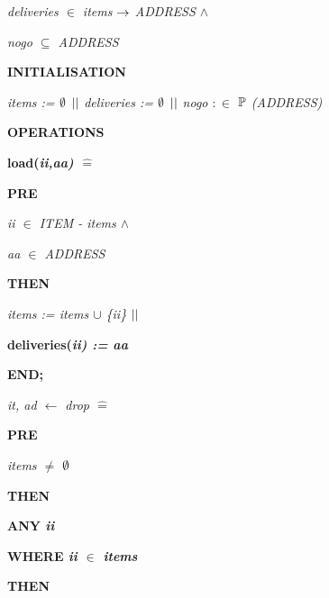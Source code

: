 \documentclass[11pt]{article}
\begin{document}
\begin{sloppypar}
\hspace*{0.20in}\it deliveries  $\in$  \it items  $\rightarrow$  \it ADDRESS  $\land$ 

\hspace*{0.20in}\it nogo  $\subseteq$  \it ADDRESS

\bf INITIALISATION

\hspace*{0.20in}\it items \rm :=  $\emptyset$   $\mbox{$\mid\mid$}$  \it deliveries \rm :=  $\emptyset$   $\mbox{$\mid\mid$}$  \it nogo  $:\in$   $\mbox{${\mathbb P}$}$ \rm (\it ADDRESS\rm )

\bf OPERATIONS

\hspace*{0.20in}\bf load\rm (\it ii\rm ,\it aa\rm ) \rm $\widehat{=}$ 

\hspace*{0.20in}\bf PRE

\hspace*{0.40in}\it ii  $\in$  \it ITEM \rm - \it items  $\land$ 

\hspace*{0.40in}\it aa  $\in$  \it ADDRESS

\hspace*{0.20in}\bf THEN

\hspace*{0.40in}\it items \rm := \it items  $\cup$  \rm \{\it ii\rm \}  $\mbox{$\mid\mid$}$ 

\hspace*{0.40in}\bf deliveries\rm (\it ii\rm ) \rm := \it aa

\hspace*{0.20in}\bf END\rm ;

\hspace*{0.20in}

\hspace*{0.20in}\it it\rm , \it ad  $\leftarrow$  \it drop \rm $\widehat{=}$ 

\hspace*{0.20in}\bf PRE

\hspace*{0.40in}\it items  $\not =$   $\emptyset$ 

\hspace*{0.20in}\bf THEN

\hspace*{0.40in}\bf ANY \it ii

\hspace*{0.40in}\bf WHERE \it ii  $\in$  \it items

\hspace*{0.40in}\bf THEN


\end{sloppypar}
\end{document}
